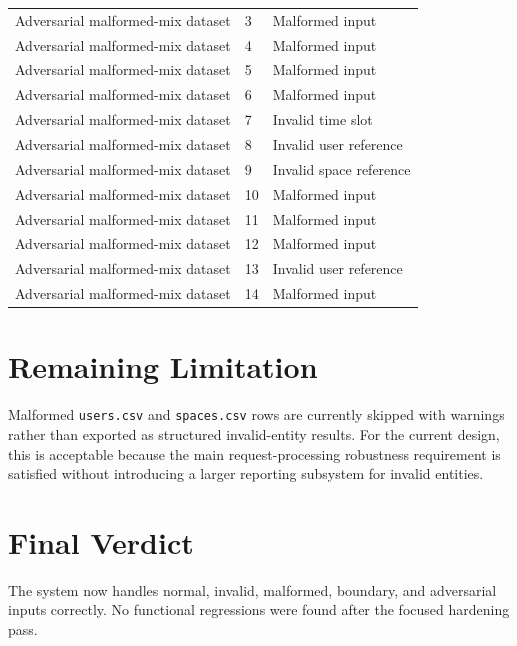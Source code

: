 \documentclass[12pt,a4paper]{article}
\begin{document}
\begin{landscape}
\begin{center}
\begin{longtable}{@{} p{4.2cm} p{2.2cm} p{13.0cm} @{}}
Adversarial malformed-mix dataset & 3 & Malformed input \\
Adversarial malformed-mix dataset & 4 & Malformed input \\
Adversarial malformed-mix dataset & 5 & Malformed input \\
Adversarial malformed-mix dataset & 6 & Malformed input \\
Adversarial malformed-mix dataset & 7 & Invalid time slot \\
Adversarial malformed-mix dataset & 8 & Invalid user reference \\
Adversarial malformed-mix dataset & 9 & Invalid space reference \\
Adversarial malformed-mix dataset & 10 & Malformed input \\
Adversarial malformed-mix dataset & 11 & Malformed input \\
Adversarial malformed-mix dataset & 12 & Malformed input \\
Adversarial malformed-mix dataset & 13 & Invalid user reference \\
Adversarial malformed-mix dataset & 14 & Malformed input \\
\bottomrule
\end{longtable}
\end{center}
\end{landscape}

\section{Remaining Limitation}
Malformed \texttt{users.csv} and \texttt{spaces.csv} rows are currently skipped with warnings rather than exported as structured invalid-entity results. For the current design, this is acceptable because the main request-processing robustness requirement is satisfied without introducing a larger reporting subsystem for invalid entities.

\section{Final Verdict}
The system now handles normal, invalid, malformed, boundary, and adversarial inputs correctly. No functional regressions were found after the focused hardening pass.
\end{document}
